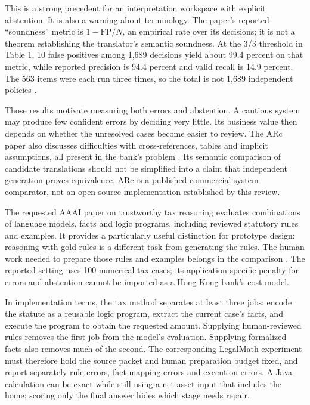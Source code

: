 
This is a strong precedent for an interpretation workspace with explicit
abstention. It is also a warning about terminology. The paper's reported
``soundness'' metric is $1-\mathrm{FP}/N$, an empirical rate over its decisions;
it is not a theorem establishing the translator's semantic soundness. At the
3/3 threshold in Table 1, 10 false positives among 1,689 decisions yield about
99.4 percent on that metric, while reported precision is 94.4 percent and valid
recall is 14.9 percent. The 563 items were each run three times, so the total is
not 1,689 independent policies \citep[sec.~4, Table~1]{arc2025}.

Those results motivate measuring both errors and abstention. A cautious system
may produce few confident errors by deciding very little. Its business value
then depends on whether the unresolved cases become easier to review. The ARc
paper also discusses difficulties with cross-references, tables and implicit
assumptions, all present in the bank's problem
\citep[sec.~5 and app.~A.1]{arc2025}. Its semantic comparison of candidate
translations should not be simplified into a claim that independent generation
proves equivalence. ARc is a published commercial-system comparator, not an
open-source implementation established by this review.

The requested AAAI paper on trustworthy tax reasoning evaluates combinations of
language models, facts and logic programs, including reviewed statutory rules and
examples. It provides a particularly useful distinction for prototype design:
reasoning with gold rules is a different task from generating the rules. The
human work needed to prepare those rules and examples belongs in the comparison
\citep[Tables~2--3]{jurayj2026,jurayj2025extended}. The reported setting uses
100 numerical tax cases; its application-specific penalty for errors and abstention
cannot be imported as a Hong Kong bank's cost model.

In implementation terms, the tax method separates at least three jobs: encode
the statute as a reusable logic program, extract the current case's facts, and
execute the program to obtain the requested amount. Supplying human-reviewed
rules removes the first job from the model's evaluation. Supplying formalized
facts also removes much of the second. The corresponding LegalMath experiment
must therefore hold the source packet and human preparation budget fixed, and
report separately rule errors, fact-mapping errors and execution errors. A Java
calculation can be exact while still using a net-asset input that includes the
home; scoring only the final answer hides which stage needs repair.

